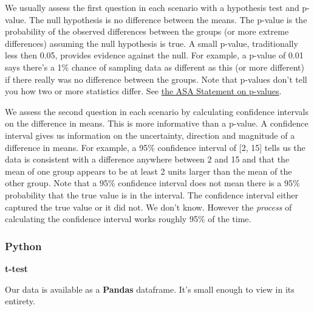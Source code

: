 \documentclass[
]{book}
\begin{document}
We usually assess the first question in each scenario with a hypothesis test and p-value. The null hypothesis is no difference between the means. The p-value is the probability of the observed differences between the groups (or more extreme differences) assuming the null hypothesis is true. A small p-value, traditionally less then 0.05, provides evidence against the null. For example, a p-value of 0.01 says there's a 1\% chance of sampling data as different as this (or more different) if there really was no difference between the groups. Note that p-values don't tell you how two or more statistics differ. See \href{https://www.tandfonline.com/doi/full/10.1080/00031305.2016.1154108\#_i28}{the ASA Statement on p-values}.

We assess the second question in each scenario by calculating confidence intervals on the difference in means. This is more informative than a p-value. A confidence interval gives us information on the uncertainty, direction and magnitude of a difference in means. For example, a 95\% confidence interval of {[}2, 15{]} tells us the data is consistent with a difference anywhere between 2 and 15 and that the mean of one group appears to be at least 2 units larger than the mean of the other group. Note that a 95\% confidence interval does not mean there is a 95\% probability that the true value is in the interval. The confidence interval either captured the true value or it did not. We don't know. However the \emph{process} of calculating the confidence interval works roughly 95\% of the time.

\hypertarget{python-47}{%
\subsubsection*{Python}\label{python-47}}

\textbf{t-test}

Our data is available as a \textbf{Pandas} dataframe. It's small enough to view in its entirety.
\end{document}
